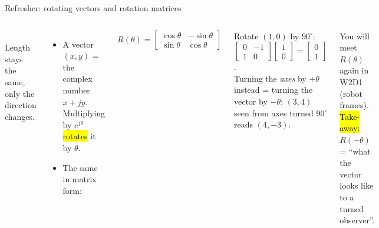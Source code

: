 \documentclass[aspectratio=169,10pt]{beamer}
\begin{document}
\begin{frame}[t]{Refresher: rotating vectors and rotation matrices}
\begin{columns}[T,onlytextwidth]
\centering
{}\\
\small Length stays the same, only the direction changes.
\begin{itemize}\small
\item A vector $(x,y)$ = the complex number $x+jy$. Multiplying by $e^{j\theta}$ \hl{rotates} it by $\theta$.
\item The same in matrix form:
\end{itemize}
\begin{eqbox}\centering
$R(\theta)=\begin{bmatrix}\cos\theta&-\sin\theta\\ \sin\theta&\cos\theta\end{bmatrix}$
\end{eqbox}
\begin{defbox}[Example]
\small Rotate $(1,0)$ by $90^\circ$: $\begin{bmatrix}0&-1\\1&0\end{bmatrix}\!\begin{bmatrix}1\\0\end{bmatrix}=\begin{bmatrix}0\\1\end{bmatrix}$.\\[1mm]
Turning the \emph{axes} by $+\theta$ instead = turning the vector by $-\theta$: $(3,4)$ seen from axes turned $90^\circ$ reads $(4,-3)$.
\end{defbox}
\small You will meet $R(\theta)$ again in W2D1 (robot frames).\\ \hl{Take-away:} $R(-\theta)$ = ``what the vector looks like to a turned observer''.
\end{columns}
\end{frame}
\end{document}
